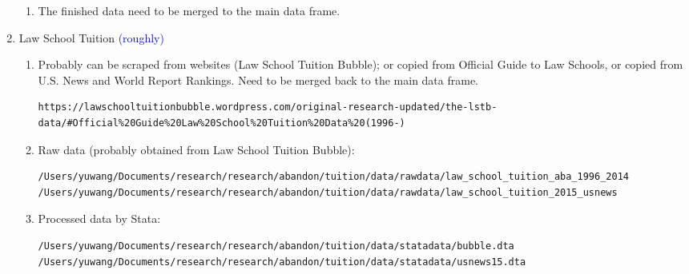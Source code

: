 \documentclass[12pt]{article}
\begin{document}
\begin{enumerate}
\begin{enumerate}
\item The finished data need to be merged to the main data frame. 
\end{enumerate}
\item Law School Tuition \textcolor{blue}{(roughly)}
\begin{enumerate}
\item Probably can be scraped from websites (Law School Tuition Bubble); or copied from Official Guide to Law Schools, or copied from U.S. News and World Report Rankings. Need to be merged back to the main data frame.
\small
\begin{verbatim}
https://lawschooltuitionbubble.wordpress.com/original-research-updated/the-lstb-data/#Official%20Guide%20Law%20School%20Tuition%20Data%20(1996-)
\end{verbatim}
\normalsize
\item Raw data (probably obtained from Law School Tuition Bubble): 
\small
\begin{verbatim}
/Users/yuwang/Documents/research/research/abandon/tuition/data/rawdata/law_school_tuition_aba_1996_2014
/Users/yuwang/Documents/research/research/abandon/tuition/data/rawdata/law_school_tuition_2015_usnews
\end{verbatim}
\normalsize
\item Processed data by Stata:
\begin{verbatim}
/Users/yuwang/Documents/research/research/abandon/tuition/data/statadata/bubble.dta
/Users/yuwang/Documents/research/research/abandon/tuition/data/statadata/usnews15.dta
\end{verbatim}
\end{enumerate}

\end{enumerate}
\end{document}
